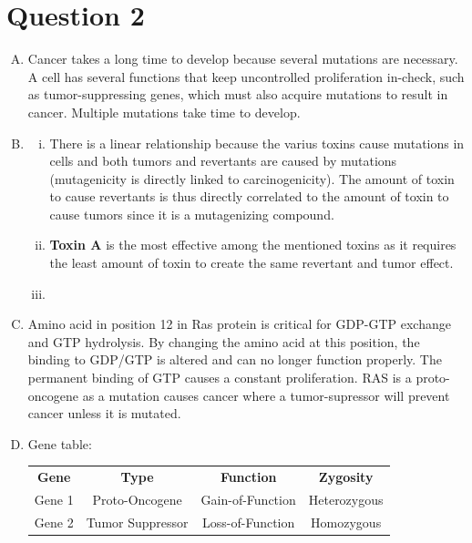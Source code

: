 \documentclass{article}
\begin{document}
\section*{ Question 2 }

\begin{enumerate}[A.]
    \item Cancer takes a long time to develop because several mutations are
        necessary. A cell has several functions that keep uncontrolled
        proliferation in-check, such as tumor-suppressing genes, which must also
        acquire mutations to result in cancer. Multiple mutations take time to
        develop.

    \item 
        \begin{enumerate}[i.]
            \item There is a linear relationship because the varius toxins cause
                mutations in cells and both tumors and revertants are caused by
                mutations (mutagenicity is directly linked to carcinogenicity).
                The amount of toxin to cause revertants is thus directly
                correlated to the amount of toxin to cause tumors since it is a
                mutagenizing compound.

            \item \textbf{Toxin A} is the most effective among the mentioned
                toxins as it requires the least amount of toxin to create the
                same revertant and tumor effect.

            \item 
        \end{enumerate}

    \item Amino acid in position 12 in Ras protein is critical for GDP-GTP
        exchange and GTP hydrolysis. By changing the amino acid at this
        position, the binding to GDP/GTP is altered and can no longer function
        properly. The permanent binding of GTP causes a constant proliferation.
        RAS is a proto-oncogene as a mutation causes cancer where a
        tumor-supressor will prevent cancer unless it is mutated.

    \item Gene table:
        \begin{center}
            \begin{tabular}{ c c c c }
                \textbf{Gene} & \textbf{Type} & \textbf{Function} &
                \textbf{ Zygosity } \\
                Gene 1 & Proto-Oncogene & Gain-of-Function & Heterozygous \\
                Gene 2 & Tumor Suppressor & Loss-of-Function & Homozygous 
            \end{tabular}
        \end{center}
\end{enumerate}
\end{document}
